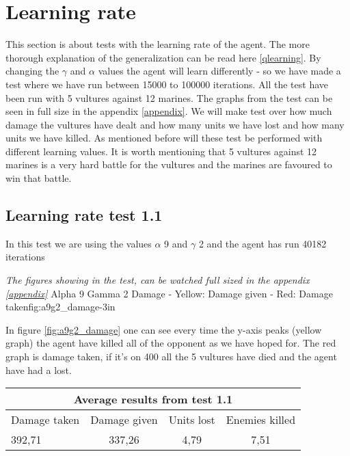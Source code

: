 \section{Learning rate}
This section is about tests with the learning rate of the agent. The more thorough explanation of the generalization can be read here \ref{qlearning}.
By changing the $\gamma$ and $\alpha$ values the agent will learn differently - so we have made a test where we have run between 15000 to 100000 iterations. All the test have been run with 5 vultures against 12 marines. The graphs from the test can be seen in full size in the appendix \ref{appendix}. We will make test over how much damage the vultures have dealt and how many units we have lost and how many units we have killed. As mentioned before will these test be performed with different learning values. It is worth mentioning that 5 vultures against 12 marines is a very hard battle for the vultures and the marines are favoured to win that battle.



\subsection*{Learning rate test 1.1}
In this test we are using the values $\alpha$ 9 and $\gamma$ 2 and the agent has run 40182 iterations


\textit{The figures showing in the test, can be watched full sized in the appendix \ref{appendix}} 
			{Alpha 9 Gamma 2 Damage - Yellow: Damage given - Red: Damage taken}{fig:a9g2_damage}{-3in}

In figure \ref{fig:a9g2_damage} one can see every time the y-axis peaks (yellow graph) the agent have killed all of the opponent as we have hoped for. The red graph is damage taken, if it's on 400 all the 5 vultures have died and the agent have had a lost.

\begin{centering}
 \begin{tabular}{|l||c|c|c|}
	\multicolumn{4}{c}{Average results from test 1.1} \\
	\hline
		Damage taken & Damage given & Units lost & Enemies killed\\
	\hline
		392,71 & 337,26 & 4,79 & 7,51 \\
	\hline

\end{tabular}
\end{centering}

